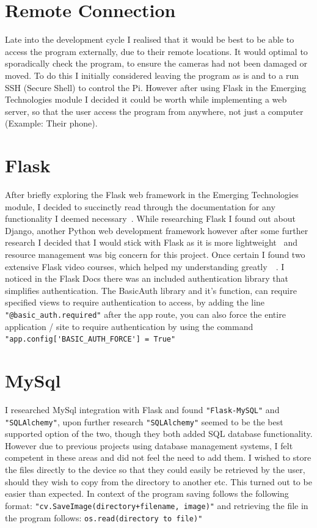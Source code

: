 \section{Remote Connection}
Late into the development cycle I realised that it would be best to be able to access the program externally, due to their remote locations. It would optimal to sporadically check the program, to ensure the cameras had not been damaged or moved. To do this I initially considered leaving the program as is and to a run SSH (Secure Shell) to control the Pi. However after using Flask in the Emerging Technologies module I decided it could be worth while implementing a web server, so that the user access the program from anywhere, not just a computer (Example: Their phone).

\section{Flask}
After briefly exploring the Flask web framework in the Emerging Technologies module, I decided to succinctly read through the documentation for any functionality I deemed necessary~\cite{flask}. While researching Flask I found out about Django, another Python web development framework however after some further research I decided that I would stick with Flask as it is more lightweight~\cite{flaskVDjango} and resource management was big concern for this project. Once certain I found two extensive Flask video courses, which helped my understanding greatly~\cite{flaskCourse}~\cite{flaskCourse2}. I noticed in the Flask Docs there was an included authentication library that simplifies authentication. The BasicAuth library and it's function, can require specified views to require authentication to access, by adding the line
\verb|"@basic_auth.required"| after the app route, you can also force the entire application / site to require authentication by using the command \verb|"app.config['BASIC_AUTH_FORCE'] = True"|
\section{MySql}
 I researched MySql integration with Flask and found  \verb|"Flask-MySQL"| and \verb|"SQLAlchemy"|, upon further research  \verb|"SQLAlchemy"| seemed to be the best supported option of the two, though they both added SQL database functionality. However due to previous projects using database management systems, I felt competent in these areas and did not feel the need to add them. I wished to store the files directly to the device so that they could easily be retrieved by the user, should they wish to copy from the directory to another etc. This turned out to be easier than expected. In context of the program saving follows the following format: \verb|"cv.SaveImage(directory+filename, image)"| and retrieving the file in the program follows: \verb|os.read(directory to file)"|
